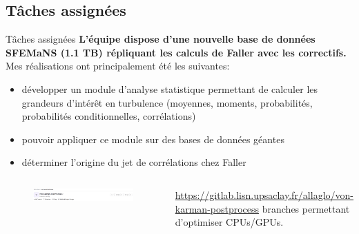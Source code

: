 \documentclass[aspectratio=169,usenames,dvipsnames]{beamer}
\begin{document}
\subsection{Tâches assignées}
\begin{frame}{Tâches assignées}
\centering
{\bf L'équipe dispose d'une nouvelle base de données SFEMaNS (1.1 TB) répliquant les calculs
de Faller avec les correctifs.}\\
\vspace{.5cm}\pause
Mes réalisations ont principalement été les suivantes:\pause
\begin{itemize}[label=]
    \item développer un module d'analyse statistique permettant de calculer les grandeurs
          d'intérêt en turbulence (moyennes, moments, probabilités, probabilités conditionnelles, corrélations)\pause
    \item pouvoir appliquer ce module sur des bases de données géantes\pause
    \item déterminer l'origine du jet de corrélations chez Faller\pause
\end{itemize}
\begin{columns}
    \begin{figure}[h]
        \centering
        \includegraphics[width=\linewidth]{figs/module.png}
    \end{figure}
    \href{https://gitlab.lisn.upsaclay.fr/allaglo/von-karman-postprocess}
    {https://gitlab.lisn.upsaclay.fr/allaglo/von-karman-postprocess}
     branches permettant d'optimiser CPUs/GPUs.
\end{columns}
\end{frame} %
% 

\end{document}
